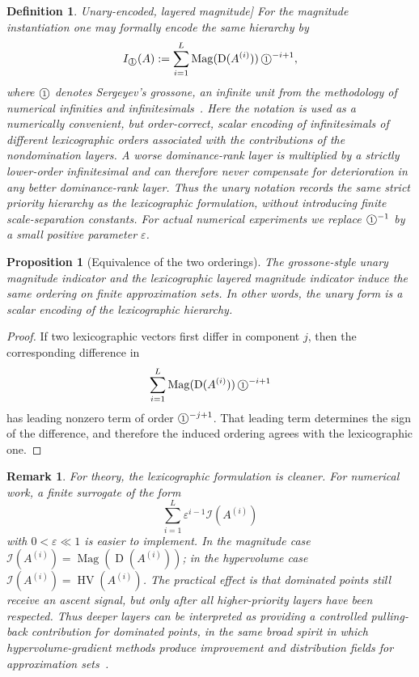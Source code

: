 \documentclass{article}
\newtheorem{definition}{Definition}
\newtheorem{proposition}{Proposition}
\newtheorem{remark}{Remark}
\newcommand{\Mag}{\operatorname{Mag}}
\newcommand{\HV}{\operatorname{HV}}
\newcommand{\Ginf}{\text{\textcircled{\scriptsize 1}}}
\newcommand{\front}[1]{A^{(#1)}}
\newcommand{\Dom}{\operatorname{D}}
\begin{document}
\begin{definition}Unary-encoded, layered magnitude]
For the magnitude instantiation one may formally encode the same hierarchy by
\[
I_{\Ginf}(A):=
\sum_{i=1}^{L}\Mag(\Dom(\front{i}))\,\Ginf^{-i+1},
\]
where $\Ginf$ denotes Sergeyev's grossone, an infinite unit from the methodology of numerical infinities and infinitesimals~\cite{sergeyev2017numerical}.  Here the notation is used as a numerically convenient, but order-correct, scalar encoding of infinitesimals of different lexicographic orders associated with the contributions of the nondomination layers.  A worse dominance-rank layer is multiplied by a strictly lower-order infinitesimal and can therefore never compensate for deterioration in any better dominance-rank layer.  Thus the unary notation records the same strict priority hierarchy as the lexicographic formulation, without introducing finite scale-separation constants.  For actual numerical experiments we replace $\Ginf^{-1}$ by a small positive parameter $\varepsilon$.
\end{definition}

\begin{proposition}[Equivalence of the two orderings]
The grossone-style unary magnitude indicator and the lexicographic layered magnitude indicator induce the same ordering on finite approximation sets. In other words, the unary form is a scalar encoding of the lexicographic hierarchy.
\end{proposition}

\begin{proof}
If two lexicographic vectors first differ in component $j$, then the corresponding difference in
\[
\sum_{i=1}^{L}\Mag(\Dom(\front{i}))\,\Ginf^{-i+1}
\]
has leading nonzero term of order $\Ginf^{-j+1}$. That leading term determines the sign of the difference, and therefore the induced ordering agrees with the lexicographic one.
\end{proof}

\begin{remark}
For theory, the lexicographic formulation is cleaner. For numerical work, a finite surrogate of the form
\[
\sum_{i=1}^{L}\varepsilon^{i-1}\mathcal I(\front{i})
\]
with $0<\varepsilon\ll 1$ is easier to implement.  In the magnitude case $\mathcal I(\front{i})=\Mag(\Dom(\front{i}))$; in the hypervolume case $\mathcal I(\front{i})=\HV(\front{i})$.  The practical effect is that dominated points still receive an ascent signal, but only after all higher-priority layers have been respected.  Thus deeper layers can be interpreted as providing a controlled \emph{pulling-back} contribution for dominated points, in the same broad spirit in which hypervolume-gradient methods produce improvement and distribution fields for approximation sets~\cite{emmerichdeutzbeume2007,deistetal2020}.
\end{remark}
\end{document}
